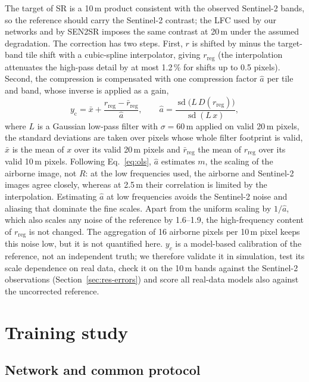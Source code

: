 \documentclass[pdflatex,sn-basic,referee,lineno]{sn-jnl}
\newcommand{\rreg}{r_{\mathrm{reg}}}
\begin{document}
The target of SR is a 10\,m product consistent with the observed Sentinel-2 bands, so the reference should carry
the Sentinel-2 contrast;
the LFC used by our networks and by SEN2SR imposes the same contrast at 20\,m under the assumed degradation. The correction has two steps.
First, $r$ is shifted by minus the target-band tile shift with a cubic-spline interpolator, giving $\rreg$ (the
interpolation attenuates the high-pass detail by at most 1.2\,\% for shifts up to 0.5 pixels). Second, the
compression is compensated with one compression factor $\hat a$ per tile and band, whose inverse is applied as a
gain,
\begin{equation}
y_{\mathrm{c}} = \bar x + \frac{\rreg - \bar r_{\mathrm{reg}}}{\hat a}, \qquad
\hat a = \frac{\operatorname{sd}\big(L\,D(\rreg)\big)}{\operatorname{sd}(L\,x)}, \label{eq:gain}
\end{equation}
where $L$ is a Gaussian low-pass filter with $\sigma=60$\,m applied on valid 20\,m pixels, the standard deviations
are taken over pixels whose whole filter footprint is valid, $\bar x$ is the mean of $x$ over its valid 20\,m
pixels and $\bar r_{\mathrm{reg}}$ the mean of $\rreg$ over its valid 10\,m pixels. Following Eq.~\eqref{eq:ols}, $\hat a$
estimates $m$, the scaling of the airborne image, not $R$: at the low frequencies used, the airborne and
Sentinel-2 images agree closely, whereas at 2.5\,m their correlation is limited by the interpolation. Estimating
$\hat a$ at low frequencies avoids the Sentinel-2 noise and aliasing that dominate the fine scales. Apart
from the uniform scaling by $1/\hat a$, which also scales any noise of the reference by 1.6--1.9, the
high-frequency content of $\rreg$ is not changed. The aggregation of 16 airborne pixels per 10\,m pixel keeps
this noise low, but it is not quantified here. $y_c$ is a model-based calibration of the
reference, not an independent truth; we therefore validate it in simulation, test its scale dependence on real data,
check it on the 10\,m bands against the Sentinel-2 observations (Section~\ref{sec:res-errors}) and score all
real-data models also against the uncorrected reference.

\section{Training study}\label{sec:method-training}

\subsection{Network and common protocol}
\end{document}
